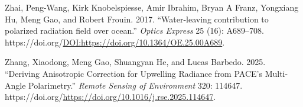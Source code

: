 \documentclass[
  11pt,
  letterpaper,
  DIV=11,
  numbers=noendperiod]{scrreprt}
\newlength{\cslhangindent}
\newenvironment{CSLReferences}[2] %
 {\begin{list}{}{%
  \setlength{\itemindent}{0pt}
  \setlength{\leftmargin}{0pt}
  \setlength{\parsep}{0pt}
  \ifodd #1
   \setlength{\leftmargin}{\cslhangindent}
   \setlength{\itemindent}{-1\cslhangindent}
  \fi
  \setlength{\itemsep}{#2\baselineskip}}}
 {\end{list}}
\begin{document}
\begin{CSLReferences}{1}{0}
Zhai, Peng-Wang, Kirk Knobelspiesse, Amir Ibrahim, Bryan A Franz,
Yongxiang Hu, Meng Gao, and Robert Frouin. 2017. {``{Water-leaving
contribution to polarized radiation field over ocean}.''} \emph{Optics
Express} 25 (16): A689--708.
https://doi.org/\url{DOI:https://doi.org/10.1364/OE.25.00A689}.

Zhang, Xiaodong, Meng Gao, Shuangyan He, and Lucas Barbedo. 2025.
{``Deriving Anisotropic Correction for Upwelling Radiance from PACE's
Multi-Angle Polarimetry.''} \emph{Remote Sensing of Environment} 320:
114647. https://doi.org/\url{https://doi.org/10.1016/j.rse.2025.114647}.

\end{CSLReferences}
\end{document}
